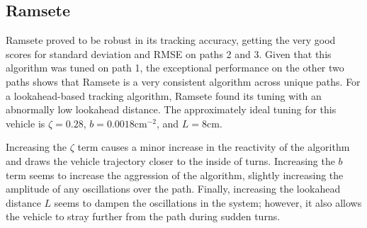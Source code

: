 \documentclass[12pt]{article}
\begin{document}
\begin{flushleft}
\begin{figure}[H]
\endminipage
\end{figure}

\subsection{Ramsete}

Ramsete proved to be robust in its tracking accuracy, getting the very good scores for standard deviation and RMSE on paths 2 and 3. Given that this algorithm was tuned on path 1, the exceptional performance on the other two paths shows that Ramsete is a very consistent algorithm across unique paths. For a lookahead-based tracking algorithm, Ramsete found its tuning with an abnormally low lookahead distance. The approximately ideal tuning for this vehicle is $\zeta=0.28$, $b=0.0018\text{cm}^{-2}$, and $L=8$cm.

Increasing the $\zeta$ term causes a minor increase in the reactivity of the algorithm and draws the vehicle trajectory closer to the inside of turns. Increasing the $b$ term seems to increase the aggression of the algorithm, slightly increasing the amplitude of any oscillations over the path. Finally, increasing the lookahead distance $L$ seems to dampen the oscillations in the system; however, it also allows the vehicle to stray further from the path during sudden turns.


\end{flushleft}
\end{document}
